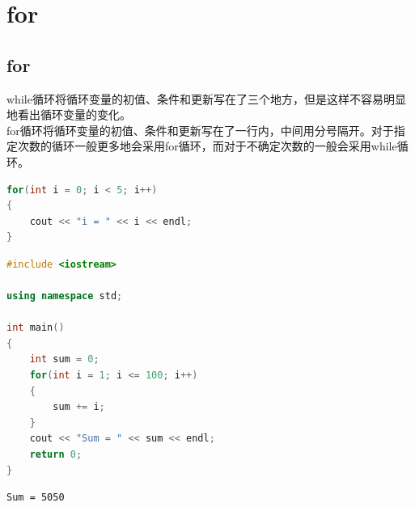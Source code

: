 \newpage

\section{for}

\subsection{for}

while循环将循环变量的初值、条件和更新写在了三个地方，但是这样不容易明显地看出循环变量的变化。\\

for循环将循环变量的初值、条件和更新写在了一行内，中间用分号隔开。对于指定次数的循环一般更多地会采用for循环，而对于不确定次数的一般会采用while循环。

\vspace{-0.5cm}

\begin{lstlisting}[language=C++]
for(int i = 0; i < 5; i++)
{
    cout << "i = " << i << endl;
}
\end{lstlisting}

\vspace{0.5cm}


\begin{lstlisting}[language=C++]
#include <iostream>

using namespace std;

int main()
{
    int sum = 0;
    for(int i = 1; i <= 100; i++)
    {
        sum += i;
    }
    cout << "Sum = " << sum << endl;
    return 0;
}
\end{lstlisting}

\begin{tcolorbox}
    \begin{verbatim}
Sum = 5050
\end{verbatim}
\end{tcolorbox}

\vspace{0.5cm}



